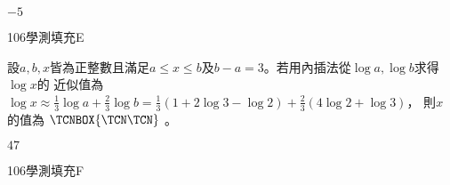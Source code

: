\begin{QUESTIONS}
\begin{QUESTION}
        \begin{QFROMS}
        \end{QFROMS}
        \begin{QTAGS}\end{QTAGS}
        \begin{QANS}
            $-5$
        \end{QANS}
        \begin{QSOLLIST}
        \end{QSOLLIST}
        \begin{QEMPTYSPACE}
        \end{QEMPTYSPACE}
    \end{QUESTION}
    \begin{QUESTION}
        \begin{ExamInfo}{106}{學測}{填充}{E}
        \end{ExamInfo}
        \begin{ExamAnsRateInfo}{24}{59}{12}{1}
        \end{ExamAnsRateInfo}
        \begin{QBODY}
            設$a,b,x$皆為正整數且滿足$a\le x\le b$及$b-a=3$。若用內插法從$\log a,\log b$求得$\log x$的
			近似值為
			$\log x\approx {}\log a+\log b=(1+2-)+(4+)$，
			則$x$的值為 $\TCNBOX{\TCN\TCN}$        。
        \end{QBODY}
        \begin{QFROMS}
        \end{QFROMS}
        \begin{QTAGS}\end{QTAGS}
        \begin{QANS}
            $47$
        \end{QANS}
        \begin{QSOLLIST}
        \end{QSOLLIST}
        \begin{QEMPTYSPACE}
        \end{QEMPTYSPACE}
    \end{QUESTION}
    \begin{QUESTION}
        \begin{ExamInfo}{106}{學測}{填充}{F}

\end{ExamInfo}
\end{QUESTION}
\end{QUESTIONS}
